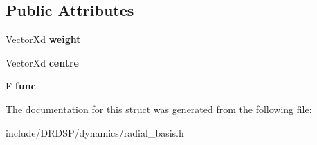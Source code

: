 \subsection*{Public Attributes}
\begin{DoxyCompactItemize}
\item 
\hypertarget{struct_d_r_d_s_p_1_1_equi_r_b_f_z2_a087db1111f2c8cbb83a5bde1802f2830}{Vector\-Xd {\bfseries weight}}\label{struct_d_r_d_s_p_1_1_equi_r_b_f_z2_a087db1111f2c8cbb83a5bde1802f2830}

\item 
\hypertarget{struct_d_r_d_s_p_1_1_equi_r_b_f_z2_a34be853d4b027414a967af01c95b75bf}{Vector\-Xd {\bfseries centre}}\label{struct_d_r_d_s_p_1_1_equi_r_b_f_z2_a34be853d4b027414a967af01c95b75bf}

\item 
\hypertarget{struct_d_r_d_s_p_1_1_equi_r_b_f_z2_a757a44c05ef678bdaa71c733bfb969ca}{F {\bfseries func}}\label{struct_d_r_d_s_p_1_1_equi_r_b_f_z2_a757a44c05ef678bdaa71c733bfb969ca}

\end{DoxyCompactItemize}


The documentation for this struct was generated from the following file\-:\begin{DoxyCompactItemize}
\item 
include/\-D\-R\-D\-S\-P/dynamics/radial\-\_\-basis.\-h\end{DoxyCompactItemize}
